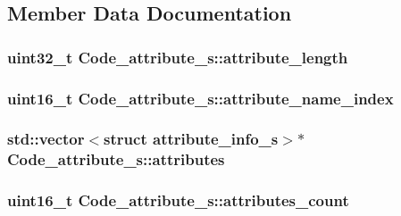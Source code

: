 \subsection{Member Data Documentation}
\hypertarget{structCode__attribute__s_a83fe4677e5b3b8a9fb6460b064148ac3}{
\subsubsection[{attribute\+\_\+length}]{\setlength{\rightskip}{0pt plus 5cm}uint32\+\_\+t Code\+\_\+attribute\+\_\+s\+::attribute\+\_\+length}}\label{structCode__attribute__s_a83fe4677e5b3b8a9fb6460b064148ac3}
\hypertarget{structCode__attribute__s_a2ad36c662b25c88553dffda3499b304a}{
\subsubsection[{attribute\+\_\+name\+\_\+index}]{\setlength{\rightskip}{0pt plus 5cm}uint16\+\_\+t Code\+\_\+attribute\+\_\+s\+::attribute\+\_\+name\+\_\+index}}\label{structCode__attribute__s_a2ad36c662b25c88553dffda3499b304a}
\hypertarget{structCode__attribute__s_a04152c5c6f9f1067d6e144e1e3a814fe}{
\subsubsection[{attributes}]{\setlength{\rightskip}{0pt plus 5cm}std\+::vector$<$struct {\bf attribute\+\_\+info\+\_\+s}$>$$\ast$ Code\+\_\+attribute\+\_\+s\+::attributes}}\label{structCode__attribute__s_a04152c5c6f9f1067d6e144e1e3a814fe}
\hypertarget{structCode__attribute__s_a12d5860b06a8484744852c38cb79144e}{
\subsubsection[{attributes\+\_\+count}]{\setlength{\rightskip}{0pt plus 5cm}uint16\+\_\+t Code\+\_\+attribute\+\_\+s\+::attributes\+\_\+count}}\label{structCode__attribute__s_a12d5860b06a8484744852c38cb79144e}
